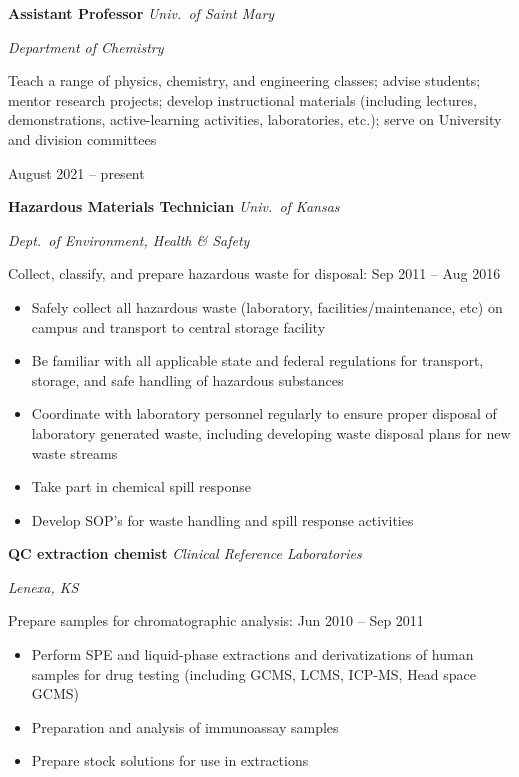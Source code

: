 {\bf Assistant Professor} \hfill \textit{Univ.\ of Saint Mary}

\hfill \textit{Department of Chemistry}

\begin{minipage}[t]{0.6\textwidth}
  Teach a range of physics, chemistry, and engineering classes; advise students; mentor research projects; develop instructional materials (including lectures, demonstrations, active-learning activities, laboratories, etc.); serve on University and division committees
\end{minipage}
\hfill August 2021 -- present


\vspace{\y}
{\bf Hazardous Materials Technician} \hfill \textit{Univ.\ of Kansas}

\hfill \textit{Dept.\ of Environment, Health \& Safety}

Collect, classify, and prepare hazardous waste for disposal: \hfill Sep 2011 -- Aug 2016
\begin{itemize}[rightmargin=\dimexpr\linewidth-8cm-\leftmargin\relax,noitemsep,topsep=0cm]
  \item Safely collect all hazardous waste (laboratory, facilities/maintenance, etc) on campus and transport to central storage facility
  \item Be familiar with all applicable state and federal regulations for transport, storage, and safe handling of hazardous substances
  \item Coordinate with laboratory personnel regularly to ensure proper disposal of laboratory generated waste, including developing waste disposal plans for new waste streams
  \item Take part in chemical spill response
  \item Develop SOP's for waste handling and spill response activities
\end{itemize}

\vspace{\y}
{\bf QC extraction chemist} \hfill \textit{Clinical Reference Laboratories}

\hfill \textit{Lenexa, KS}

Prepare samples for chromatographic analysis: \hfill Jun 2010 -- Sep 2011
\begin{itemize}[rightmargin=\dimexpr\linewidth-8cm-\leftmargin\relax,noitemsep,topsep=0cm]
  \item Perform SPE and liquid-phase extractions and derivatizations of human samples for drug testing (including GCMS, LCMS, ICP-MS, Head space GCMS)
  \item Preparation and analysis of immunoassay samples
  \item Prepare stock solutions for use in extractions
\end{itemize}
